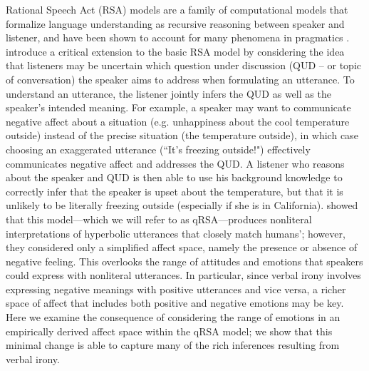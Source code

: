 \documentclass[10pt,letterpaper]{article}
\begin{document}
Rational Speech Act (RSA) models are a family of computational models that formalize language understanding as recursive reasoning between speaker and listener, and have been shown to account for many phenomena in pragmatics \cite{frank2012predicting, goodman2013knowledge}.  introduce a critical extension to the basic RSA model by considering the idea that listeners may be uncertain which question under discussion (QUD -- or topic of conversation) the speaker aims to address when formulating an utterance. To understand an utterance, the listener jointly infers the QUD as well as the speaker's intended meaning. For example, a speaker may want to communicate negative affect about a situation (e.g. unhappiness about the cool temperature outside) instead of the precise situation (the temperature outside), in which case choosing an exaggerated utterance (``It's freezing outside!") effectively communicates negative affect and addresses the QUD. A listener who reasons about the speaker and QUD is then able to use his background knowledge to correctly infer that the speaker is upset about the temperature, but that it is unlikely to be literally freezing outside (especially if she is in California). 
 showed that this model---which we will refer to as qRSA---produces nonliteral interpretations of hyperbolic utterances that closely match humans'; however, they considered only a simplified affect space, namely the presence or absence of negative feeling. This overlooks the range of attitudes and emotions that speakers could express with nonliteral utterances. In particular, since verbal irony involves expressing negative meanings with positive utterances and vice versa, a richer space of affect that includes both positive and negative emotions may be key. Here we examine the consequence of considering the range of emotions in an empirically derived affect space within the qRSA model; we show that this minimal change is able to capture many of the rich inferences resulting from verbal irony.



\end{document}
